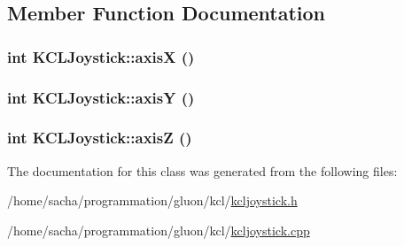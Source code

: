 \subsection{Member Function Documentation}
\hypertarget{class_k_c_l_joystick_70988b3702bf410f86a66fb1277913fd}{
\subsubsection[{axisX}]{\setlength{\rightskip}{0pt plus 5cm}int KCLJoystick::axisX ()}}
\label{class_k_c_l_joystick_70988b3702bf410f86a66fb1277913fd}


\hypertarget{class_k_c_l_joystick_0055ef283714ae8545021761e2903376}{
\subsubsection[{axisY}]{\setlength{\rightskip}{0pt plus 5cm}int KCLJoystick::axisY ()}}
\label{class_k_c_l_joystick_0055ef283714ae8545021761e2903376}


\hypertarget{class_k_c_l_joystick_d70bc33c4d0d9d92ec2583f723f157d3}{
\subsubsection[{axisZ}]{\setlength{\rightskip}{0pt plus 5cm}int KCLJoystick::axisZ ()}}
\label{class_k_c_l_joystick_d70bc33c4d0d9d92ec2583f723f157d3}




The documentation for this class was generated from the following files:\begin{CompactItemize}
\item 
/home/sacha/programmation/gluon/kcl/\hyperlink{kcljoystick_8h}{kcljoystick.h}\item 
/home/sacha/programmation/gluon/kcl/\hyperlink{kcljoystick_8cpp}{kcljoystick.cpp}\end{CompactItemize}
